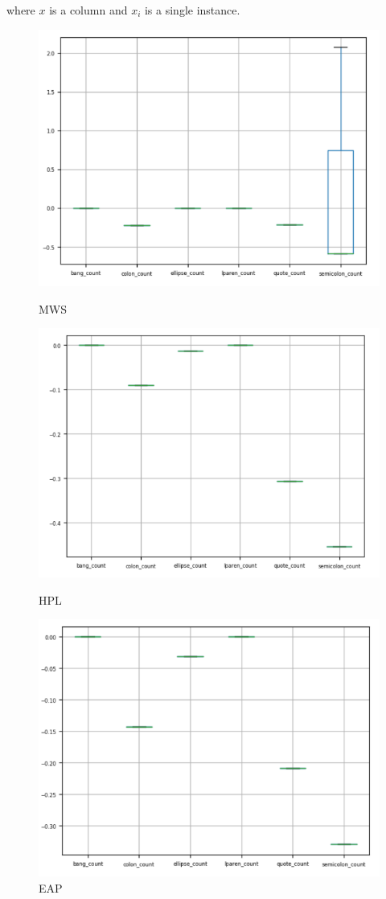 \documentclass[12pt]{article}
\begin{document}
where $x$ is a column and $x_i$ is a single instance.
\vskip 0.2in
\begin{figure}[h]
  \begin{multicols}{3}
      \includegraphics[width=\linewidth]{images/punc_mws.png}\par\caption{MWS}
      \includegraphics[width=\linewidth]{images/punc_hpl.png}\par\caption{HPL}
      \includegraphics[width=\linewidth]{images/punc_eap.png}\par\caption{EAP}

\end{multicols}
\end{figure}
\end{document}

